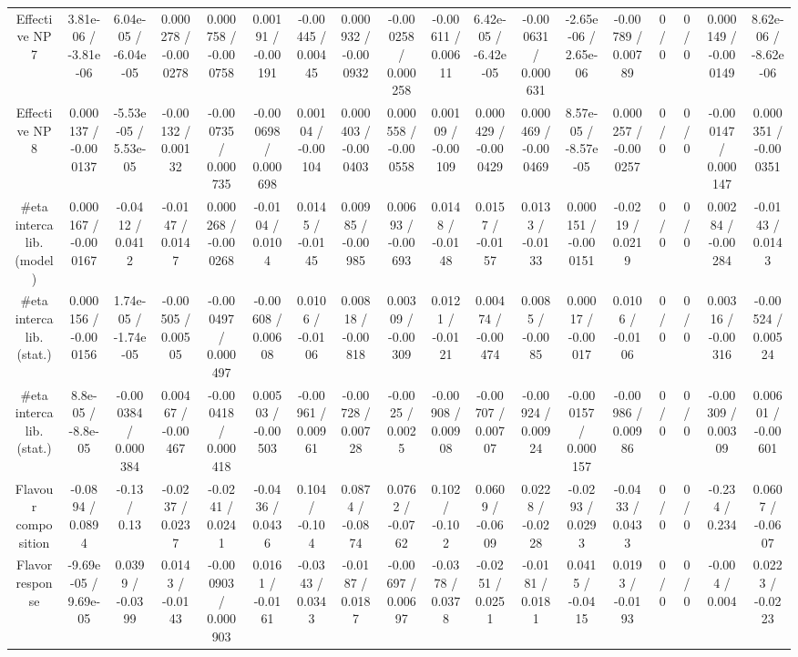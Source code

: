 \documentclass[10pt]{article}
\begin{document}
\begin{table}[htbp]
\begin{center}
\begin{tabular}{|c|c|c|c|c|c|c|c|c|c|c|c|c|c|c|c|c|c|}
  Effective NP 7 & 3.81e-06 / -3.81e-06 & 6.04e-05 / -6.04e-05 & 0.000278 / -0.000278 & 0.000758 / -0.000758 & 0.00191 / -0.00191 & -0.00445 / 0.00445 & 0.000932 / -0.000932 & -0.000258 / 0.000258 & -0.00611 / 0.00611 & 6.42e-05 / -6.42e-05 & -0.000631 / 0.000631 & -2.65e-06 / 2.65e-06 & -0.00789 / 0.00789 & 0 / 0 & 0 / 0 & 0.000149 / -0.000149 & 8.62e-06 / -8.62e-06 \\ 
  Effective NP 8 & 0.000137 / -0.000137 & -5.53e-05 / 5.53e-05 & -0.00132 / 0.00132 & -0.000735 / 0.000735 & -0.000698 / 0.000698 & 0.00104 / -0.00104 & 0.000403 / -0.000403 & 0.000558 / -0.000558 & 0.00109 / -0.00109 & 0.000429 / -0.000429 & 0.000469 / -0.000469 & 8.57e-05 / -8.57e-05 & 0.000257 / -0.000257 & 0 / 0 & 0 / 0 & -0.000147 / 0.000147 & 0.000351 / -0.000351 \\ 
  #eta intercalib. (model) & 0.000167 / -0.000167 & -0.0412 / 0.0412 & -0.0147 / 0.0147 & 0.000268 / -0.000268 & -0.0104 / 0.0104 & 0.0145 / -0.0145 & 0.00985 / -0.00985 & 0.00693 / -0.00693 & 0.0148 / -0.0148 & 0.0157 / -0.0157 & 0.0133 / -0.0133 & 0.000151 / -0.000151 & -0.0219 / 0.0219 & 0 / 0 & 0 / 0 & 0.00284 / -0.00284 & -0.0143 / 0.0143 \\ 
  #eta intercalib. (stat.) & 0.000156 / -0.000156 & 1.74e-05 / -1.74e-05 & -0.00505 / 0.00505 & -0.000497 / 0.000497 & -0.00608 / 0.00608 & 0.0106 / -0.0106 & 0.00818 / -0.00818 & 0.00309 / -0.00309 & 0.0121 / -0.0121 & 0.00474 / -0.00474 & 0.0085 / -0.0085 & 0.00017 / -0.00017 & 0.0106 / -0.0106 & 0 / 0 & 0 / 0 & 0.00316 / -0.00316 & -0.00524 / 0.00524 \\ 
  #eta intercalib. (stat.) & 8.8e-05 / -8.8e-05 & -0.000384 / 0.000384 & 0.00467 / -0.00467 & -0.000418 / 0.000418 & 0.00503 / -0.00503 & -0.00961 / 0.00961 & -0.00728 / 0.00728 & -0.0025 / 0.0025 & -0.00908 / 0.00908 & -0.00707 / 0.00707 & -0.00924 / 0.00924 & -0.000157 / 0.000157 & -0.00986 / 0.00986 & 0 / 0 & 0 / 0 & -0.00309 / 0.00309 & 0.00601 / -0.00601 \\ 
  Flavour composition & -0.0894 / 0.0894 & -0.13 / 0.13 & -0.0237 / 0.0237 & -0.0241 / 0.0241 & -0.0436 / 0.0436 & 0.104 / -0.104 & 0.0874 / -0.0874 & 0.0762 / -0.0762 & 0.102 / -0.102 & 0.0609 / -0.0609 & 0.0228 / -0.0228 & -0.0293 / 0.0293 & -0.0433 / 0.0433 & 0 / 0 & 0 / 0 & -0.234 / 0.234 & 0.0607 / -0.0607 \\ 
  Flavor response & -9.69e-05 / 9.69e-05 & 0.0399 / -0.0399 & 0.0143 / -0.0143 & -0.000903 / 0.000903 & 0.0161 / -0.0161 & -0.0343 / 0.0343 & -0.0187 / 0.0187 & -0.00697 / 0.00697 & -0.0378 / 0.0378 & -0.0251 / 0.0251 & -0.0181 / 0.0181 & 0.0415 / -0.0415 & 0.0193 / -0.0193 & 0 / 0 & 0 / 0 & -0.004 / 0.004 & 0.0223 / -0.0223 \\ 

\end{tabular}
\end{center}
\end{table}
\end{document}
